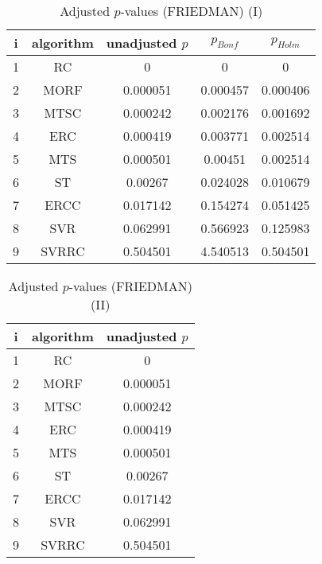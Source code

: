 \documentclass[a4paper,10pt]{article}
\begin{document}
\begin{landscape}
\begin{table}[!htp]
\centering\small
\begin{tabular}{ccccc}
i&algorithm&unadjusted $p$&$p_{Bonf}$&$p_{Holm}$\\
\hline1&RC&0&0&0\\2&MORF&0.000051&0.000457&0.000406\\3&MTSC&0.000242&0.002176&0.001692\\4&ERC&0.000419&0.003771&0.002514\\5&MTS&0.000501&0.00451&0.002514\\6&ST&0.00267&0.024028&0.010679\\7&ERCC&0.017142&0.154274&0.051425\\8&SVR&0.062991&0.566923&0.125983\\9&SVRRC&0.504501&4.540513&0.504501\\\hline
\end{tabular}
\caption{Adjusted $p$-values (FRIEDMAN) (I)}
\end{table}
\begin{table}[!htp]
\centering\small
\begin{tabular}{ccc}
i&algorithm&unadjusted $p$\\
\hline1&RC&0\\2&MORF&0.000051\\3&MTSC&0.000242\\4&ERC&0.000419\\5&MTS&0.000501\\6&ST&0.00267\\7&ERCC&0.017142\\8&SVR&0.062991\\9&SVRRC&0.504501\\\hline
\end{tabular}
\caption{Adjusted $p$-values (FRIEDMAN) (II)}
\end{table}

\newpage
\end{landscape}
\end{document}
